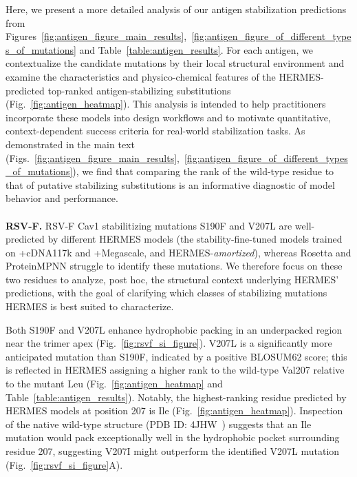 Here, we present a more detailed analysis of our antigen stabilization predictions from
Figures~\ref{fig:antigen_figure_main_results},~\ref{fig:antigen_figure_of_different_types_of_mutations}
and Table~\ref{table:antigen_results}. For each antigen, we contextualize the candidate mutations by
their local structural environment and examine the characteristics and physico-chemical features of
the HERMES-predicted top-ranked antigen-stabilizing substitutions (Fig.~\ref{fig:antigen_heatmap}).
This analysis is intended to help practitioners incorporate these models into design workflows and
to motivate quantitative, context-dependent success criteria for real-world stabilization tasks. As
demonstrated in the main text
(Figs.~\ref{fig:antigen_figure_main_results},~\ref{fig:antigen_figure_of_different_types_of_mutations}),
we find that comparing the rank of the wild-type residue to that of putative stabilizing
substitutions is an informative diagnostic of model behavior and performance.\\\\
\noindent\textbf{RSV-F.} 
RSV-F Cav1 stabilitizing mutations S190F and V207L are well-predicted by different HERMES models
(the stability-fine-tuned models trained on +cDNA117k and +Megascale, and
HERMES-\textit{amortized}), whereas Rosetta and ProteinMPNN struggle to identify these mutations. We
therefore focus on these two residues to analyze, post hoc, the structural context underlying
HERMES' predictions, with the goal of clarifying which classes of stabilizing mutations HERMES is
best suited to characterize.


Both S190F and V207L enhance hydrophobic packing in an underpacked region near the trimer apex
(Fig.~\ref{fig:rsvf_si_figure}). V207L is a significantly more anticipated mutation than S190F,
indicated by a positive BLOSUM62 score; this is reflected in HERMES assigning a higher rank to the
wild-type Val207 relative to the mutant Leu (Fig.~\ref{fig:antigen_heatmap} and
Table~\ref{table:antigen_results}). Notably, the highest-ranking residue predicted by HERMES models
at position 207 is Ile (Fig.~\ref{fig:antigen_heatmap}). Inspection of the native wild-type
structure (PDB ID: 4JHW~\citep{mclellan_structure-based_2013}) suggests that an Ile mutation would
pack exceptionally well in the hydrophobic pocket surrounding residue 207, suggesting V207I might
outperform the identified V207L mutation (Fig.~\ref{fig:rsvf_si_figure}A).


